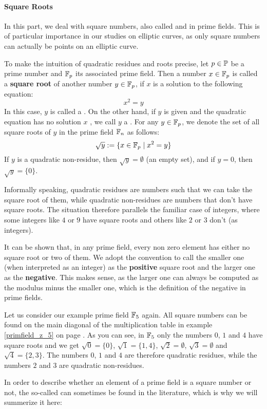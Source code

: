 \paragraph{Square Roots}
In this part, we deal with square numbers, also called  and  in prime fields. This is of particular importance in our studies on elliptic curves, as only square numbers can actually be points on an elliptic curve.

To make the intuition of quadratic residues and roots precise, let $p \in \mathbb{P} $ be a prime number and $\mathbb{F}_p $ its associated prime field. Then a number $x\in \mathbb{F}_p$ is called a \textbf{square root} of another number $y\in\mathbb{F}_p$, if $x$ is a solution to the following equation:
\begin{equation}
x^2 = y
\end{equation}
In this case, $y$ is called a . On the other hand, if $y$ is given and the quadratic equation has no solution $x$ , we call $ y $ a . For any $ y \in \mathbb{F}_p $, we denote the set of all square roots of $ y $ in the prime field $ \mathbb{F}_n $ as follows:
\begin{equation}
\sqrt{y}: = \{x \in \mathbb{F}_p \; | \; x^2 = y \}
\end{equation}
If $ y $ is a quadratic non-residue, then $ \sqrt{y} = \emptyset $ (an empty set), and if $ y = 0 $, then $ \sqrt{y} = \{0 \} $.

Informally speaking, quadratic residues are numbers such that we can take the square root of them, while quadratic non-residues are numbers that don't have square roots. The situation therefore parallels the familiar case of integers, where some integers like $4$ or $9$ have square roots and others like $2$ or $3$ don't (as integers).

It can be shown that, in any prime field, every non zero element has either no square root or two of them. We adopt the convention to call the smaller one (when interpreted as an integer) as the \textbf{positive} square root and the larger one as the \textbf{negative}. This makes sense, as the larger one can always be computed as the modulus minus the smaller one, which is the definition of the negative in prime fields.


\begin{example}  Let us consider our example prime field $\mathbb{F}_5$ again. All square numbers can be found on the main diagonal of the multiplication table in example \ref{primfield_z_5} on page \pageref{primfield_z_5}. As you can see, in $ \mathbb{F}_5 $ only the numbers $ 0 $, $ 1 $ and $ 4 $ have square roots and we get $ \sqrt{0} = \{0 \} $, $ \sqrt{1} = \{1,4 \} $, $ \sqrt{2} = \emptyset $, $ \sqrt{3} = \emptyset $ and $ \sqrt{4} = \{2,3 \} $. The numbers $0$, $1$ and $4$ are therefore quadratic residues, while the numbers $2$ and $3$ are quadratic non-residues.
\end{example}
In order to describe whether an element of a prime field is a square number  or not, the so-called  can sometimes be found in the literature, which is why we will summerize it here:

